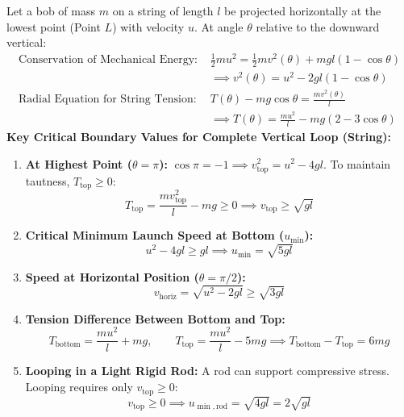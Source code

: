 \documentclass[10pt,a4paper]{article}
\begin{document}
\begin{formulabox}
Let a bob of mass $m$ on a string of length $l$ be projected horizontally at the lowest point (Point $L$) with velocity $u$.
At angle $\theta$ relative to the downward vertical:
\begin{align}
  \text{Conservation of Mechanical Energy: } &\frac{1}{2}mu^2 = \frac{1}{2}mv^2(\theta) + mgl(1 - \cos\theta) \nonumber \\
  &\implies v^2(\theta) = u^2 - 2gl(1 - \cos\theta) \\
  \text{Radial Equation for String Tension: } &T(\theta) - mg\cos\theta = \frac{mv^2(\theta)}{l} \nonumber \\
  &\implies T(\theta) = \frac{mu^2}{l} - mg(2 - 3\cos\theta)
\end{align}
\textbf{Key Critical Boundary Values for Complete Vertical Loop (String):}
\begin{enumerate}[leftmargin=*]
  \item \textbf{At Highest Point ($\theta = \pi$):} $\cos\pi = -1 \implies v_{\text{top}}^2 = u^2 - 4gl$.
  To maintain tautness, $T_{\text{top}} \ge 0$:
  \begin{equation}
    T_{\text{top}} = \frac{m v_{\text{top}}^2}{l} - mg \ge 0 \implies v_{\text{top}} \ge \sqrt{gl}
  \end{equation}
  \item \textbf{Critical Minimum Launch Speed at Bottom ($u_{\min}$):}
  \begin{equation}
    u^2 - 4gl \ge gl \implies u_{\min} = \sqrt{5gl}
  \end{equation}
  \item \textbf{Speed at Horizontal Position ($\theta = \pi/2$):}
  \begin{equation}
    v_{\text{horiz}} = \sqrt{u^2 - 2gl} \ge \sqrt{3gl}
  \end{equation}
  \item \textbf{Tension Difference Between Bottom and Top:}
  \begin{equation}
    T_{\text{bottom}} = \frac{mu^2}{l} + mg, \qquad T_{\text{top}} = \frac{mu^2}{l} - 5mg \implies T_{\text{bottom}} - T_{\text{top}} = 6mg
  \end{equation}
  \item \textbf{Looping in a Light Rigid Rod:} A rod can support compressive stress. Looping requires only $v_{\text{top}} \ge 0$:
  \begin{equation}
    v_{\text{top}} \ge 0 \implies u_{\min,\text{rod}} = \sqrt{4gl} = 2\sqrt{gl}
  \end{equation}
\end{enumerate}
\end{formulabox}
\end{document}
